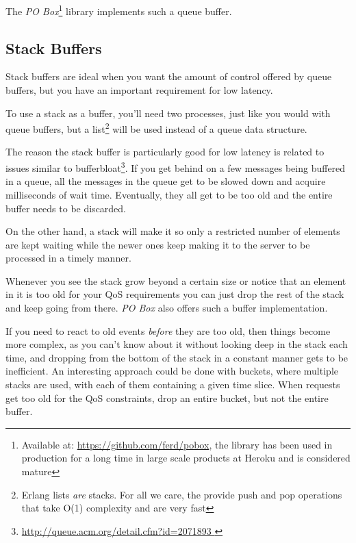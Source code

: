 \documentclass[11pt, oneside]{book}   	%
\begin{document}
The \emph{PO Box}\footnote{Available at: \href{https://github.com/ferd/pobox}{https://github.com/ferd/pobox}, the library has been used in production for a long time in large scale products at Heroku and is considered mature} library implements such a queue buffer.

\subsection{Stack Buffers}

Stack buffers are ideal when you want the amount of control offered by queue buffers, but you have an important requirement for low latency.

To use a stack as a buffer, you'll need two processes, just like you would with queue buffers, but a list\footnote{Erlang lists \emph{are} stacks. For all we care, the provide push and pop operations that take O(1) complexity and are very fast} will be used instead of a queue data structure.

The reason the stack buffer is particularly good for low latency is related to issues similar to bufferbloat\footnote{\href{http://queue.acm.org/detail.cfm?id=2071893}{http://queue.acm.org/detail.cfm?id=2071893 }}. If you get behind on a few messages being buffered in a queue, all the messages in the queue get to be slowed down and acquire milliseconds of wait time. Eventually, they all get to be too old and the entire buffer needs to be discarded.


On the other hand, a stack will make it so only a restricted number of elements are kept waiting while the newer ones keep making it to the server to be processed in a timely manner.


Whenever you see the stack grow beyond a certain size or notice that an element in it is too old for your QoS requirements you can just drop the rest of the stack and keep going from there. \emph{PO Box} also offers such a buffer implementation.

If you need to react to old events \emph{before} they are too old, then things become more complex, as you can't know about it without looking deep in the stack each time, and dropping from the bottom of the stack in a constant manner gets to be inefficient. An interesting approach could be done with buckets, where multiple stacks are used, with each of them containing a given time slice. When requests get too old for the QoS constraints, drop an entire bucket, but not the entire buffer.
\end{document}

